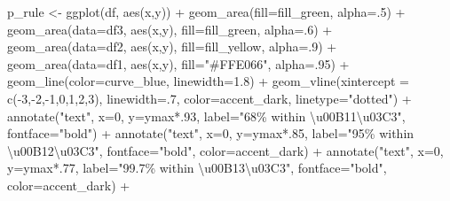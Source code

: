 \documentclass[
  letterpaper,
  DIV=11,
  numbers=noendperiod]{scrreprt}
\newenvironment{Shaded}{\begin{snugshade}}{\end{snugshade}}
\newcommand{\AttributeTok}[1]{\textcolor[rgb]{0.40,0.45,0.13}{#1}}
\newcommand{\DecValTok}[1]{\textcolor[rgb]{0.68,0.00,0.00}{#1}}
\newcommand{\FloatTok}[1]{\textcolor[rgb]{0.68,0.00,0.00}{#1}}
\newcommand{\FunctionTok}[1]{\textcolor[rgb]{0.28,0.35,0.67}{#1}}
\newcommand{\NormalTok}[1]{\textcolor[rgb]{0.00,0.23,0.31}{#1}}
\newcommand{\OtherTok}[1]{\textcolor[rgb]{0.00,0.23,0.31}{#1}}
\newcommand{\SpecialCharTok}[1]{\textcolor[rgb]{0.37,0.37,0.37}{#1}}
\newcommand{\StringTok}[1]{\textcolor[rgb]{0.13,0.47,0.30}{#1}}
\begin{document}
\begin{Shaded}
\begin{Highlighting}[]
\NormalTok{p\_rule }\OtherTok{\textless{}{-}} \FunctionTok{ggplot}\NormalTok{(df, }\FunctionTok{aes}\NormalTok{(x,y)) }\SpecialCharTok{+}
  \FunctionTok{geom\_area}\NormalTok{(}\AttributeTok{fill=}\NormalTok{fill\_green, }\AttributeTok{alpha=}\NormalTok{.}\DecValTok{5}\NormalTok{) }\SpecialCharTok{+}
  \FunctionTok{geom\_area}\NormalTok{(}\AttributeTok{data=}\NormalTok{df3, }\FunctionTok{aes}\NormalTok{(x,y), }\AttributeTok{fill=}\NormalTok{fill\_green, }\AttributeTok{alpha=}\NormalTok{.}\DecValTok{6}\NormalTok{) }\SpecialCharTok{+}
  \FunctionTok{geom\_area}\NormalTok{(}\AttributeTok{data=}\NormalTok{df2, }\FunctionTok{aes}\NormalTok{(x,y), }\AttributeTok{fill=}\NormalTok{fill\_yellow, }\AttributeTok{alpha=}\NormalTok{.}\DecValTok{9}\NormalTok{) }\SpecialCharTok{+}
  \FunctionTok{geom\_area}\NormalTok{(}\AttributeTok{data=}\NormalTok{df1, }\FunctionTok{aes}\NormalTok{(x,y), }\AttributeTok{fill=}\StringTok{"\#FFE066"}\NormalTok{, }\AttributeTok{alpha=}\NormalTok{.}\DecValTok{95}\NormalTok{) }\SpecialCharTok{+}
  \FunctionTok{geom\_line}\NormalTok{(}\AttributeTok{color=}\NormalTok{curve\_blue, }\AttributeTok{linewidth=}\FloatTok{1.8}\NormalTok{) }\SpecialCharTok{+}
  \FunctionTok{geom\_vline}\NormalTok{(}\AttributeTok{xintercept =} \FunctionTok{c}\NormalTok{(}\SpecialCharTok{{-}}\DecValTok{3}\NormalTok{,}\SpecialCharTok{{-}}\DecValTok{2}\NormalTok{,}\SpecialCharTok{{-}}\DecValTok{1}\NormalTok{,}\DecValTok{0}\NormalTok{,}\DecValTok{1}\NormalTok{,}\DecValTok{2}\NormalTok{,}\DecValTok{3}\NormalTok{), }\AttributeTok{linewidth=}\NormalTok{.}\DecValTok{7}\NormalTok{, }\AttributeTok{color=}\NormalTok{accent\_dark, }\AttributeTok{linetype=}\StringTok{"dotted"}\NormalTok{) }\SpecialCharTok{+}
  \FunctionTok{annotate}\NormalTok{(}\StringTok{"text"}\NormalTok{, }\AttributeTok{x=}\DecValTok{0}\NormalTok{, }\AttributeTok{y=}\NormalTok{ymax}\SpecialCharTok{*}\NormalTok{.}\DecValTok{93}\NormalTok{, }\AttributeTok{label=}\StringTok{"68\% within \textbackslash{}u00B11\textbackslash{}u03C3"}\NormalTok{, }\AttributeTok{fontface=}\StringTok{"bold"}\NormalTok{) }\SpecialCharTok{+}
  \FunctionTok{annotate}\NormalTok{(}\StringTok{"text"}\NormalTok{, }\AttributeTok{x=}\DecValTok{0}\NormalTok{, }\AttributeTok{y=}\NormalTok{ymax}\SpecialCharTok{*}\NormalTok{.}\DecValTok{85}\NormalTok{, }\AttributeTok{label=}\StringTok{"95\% within \textbackslash{}u00B12\textbackslash{}u03C3"}\NormalTok{, }\AttributeTok{fontface=}\StringTok{"bold"}\NormalTok{, }\AttributeTok{color=}\NormalTok{accent\_dark) }\SpecialCharTok{+}
  \FunctionTok{annotate}\NormalTok{(}\StringTok{"text"}\NormalTok{, }\AttributeTok{x=}\DecValTok{0}\NormalTok{, }\AttributeTok{y=}\NormalTok{ymax}\SpecialCharTok{*}\NormalTok{.}\DecValTok{77}\NormalTok{, }\AttributeTok{label=}\StringTok{"99.7\% within \textbackslash{}u00B13\textbackslash{}u03C3"}\NormalTok{, }\AttributeTok{fontface=}\StringTok{"bold"}\NormalTok{, }\AttributeTok{color=}\NormalTok{accent\_dark) }\SpecialCharTok{+}

\end{Highlighting}
\end{Shaded}
\end{document}
